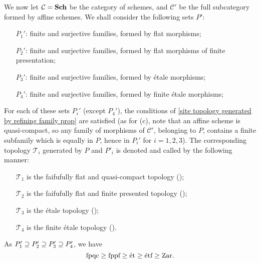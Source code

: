 We now let $\mathcal{C}=\mathbf{Sch}$ be the category of schemes, and $\mathcal{C}'$ be the full subcategory formed by affine schemes. We shall consider the following sets $P'$:
\begin{enumerate}[leftmargin=35pt]
    \item[$P_1'$:] finite and surjective families, formed by flat morphisms;
    \item[$P_2'$:] finite and surjective families, formed by flat morphisms of finite presentation;
    \item[$P_3'$:] finite and surjective families, formed by \'etale morphisms;
    \item[$P_4'$:] finite and surjective families, formed by finite \'etale morphisms;
\end{enumerate}
For each of these sets $P_i'$ (except $P_4'$), the conditions of \cref{site topology generated by refining family prop} are satisfied (as for (c), note that an affine scheme is quasi-compact, so any family of morphisms of $\mathcal{C}'$, belonging to $P$, contains a finite subfamily which is equally in $P$, hence in $P_i'$ for $i=1,2,3$). The corresponding topology $\mathcal{T}_i$ generated by $P$ and $P'_i$ is denoted and called by the following manner:
\begin{enumerate}[leftmargin=35pt]
    \item[$\mathcal{T}_1$] is the faifufully flat and quasi-compact topology (\fpqc);
    \item[$\mathcal{T}_2$] is the faifufully flat and finite presented topology (\fppf);
    \item[$\mathcal{T}_3$] is the \'etale topology (\et);
    \item[$\mathcal{T}_4$] is the finite \'etale topology (\etf).
\end{enumerate}
As $P_1'\supseteq P_2'\supseteq P_3'\supseteq P_4'$, we have
\[\textup{fpqc}\geq\textup{fppf}\geq\textup{\'et}\geq \textup{\'etf}\geq \textup{Zar}.\]

